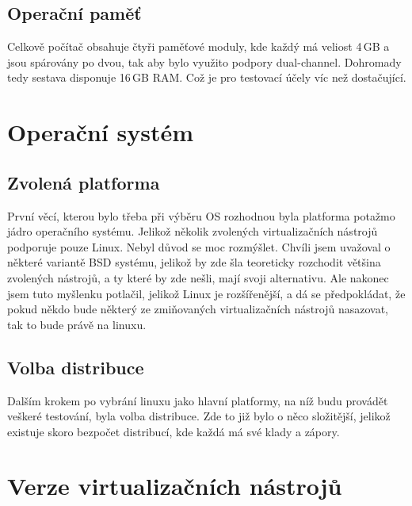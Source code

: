 \subsection{Operační paměť}
Celkově počítač obsahuje čtyři paměťové moduly, kde každý má veliost 4\,GB a jsou spárovány po dvou, tak aby bylo využito podpory dual-channel. Dohromady tedy sestava disponuje 16\,GB RAM. Což je pro testovací účely víc než dostačující.
\section{Operační systém}
\subsection{Zvolená platforma}
První věcí, kterou bylo třeba při výběru OS rozhodnou byla platforma potažmo jádro operačního systému. Jelikož několik zvolených virtualizačních nástrojů podporuje pouze Linux. Nebyl důvod se moc rozmýšlet. Chvíli jsem uvažoval o některé variantě BSD systému, jelikož by zde šla teoreticky rozchodit většina zvolených nástrojů, a ty které by zde nešli, mají svoji alternativu. Ale nakonec jsem tuto myšlenku potlačil, jelikož Linux je rozšířenější, a dá se předpokládat, že pokud někdo bude některý ze zmiňovaných virtualizačních nástrojů nasazovat, tak to bude právě na linuxu.

\subsection{Volba distribuce}
Dalším krokem po vybrání linuxu jako hlavní platformy, na níž budu provádět veškeré testování, byla volba distribuce. Zde to již bylo o něco složitější, jelikož existuje skoro bezpočet distribucí, kde každá má své klady a zápory.

 

\section{Verze virtualizačních nástrojů}
